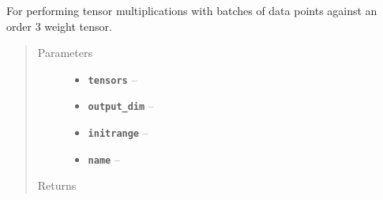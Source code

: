 \documentclass[letterpaper,10pt,english]{sphinxmanual}
\begin{document}
\begin{fulllineitems}
\label{node_ops:node_ops.ternary_tensor_combine}
For performing tensor multiplications with batches of data points against an order 3
weight tensor.
\begin{quote}\begin{description}
\item[{Parameters}] \leavevmode\begin{itemize}
\item {} 
\textbf{\texttt{tensors}} -- 

\item {} 
\textbf{\texttt{output\_dim}} -- 

\item {} 
\textbf{\texttt{initrange}} -- 

\item {} 
\textbf{\texttt{name}} -- 

\end{itemize}

\item[{Returns}] \leavevmode


\end{description}\end{quote}

\end{fulllineitems}

\end{document}
